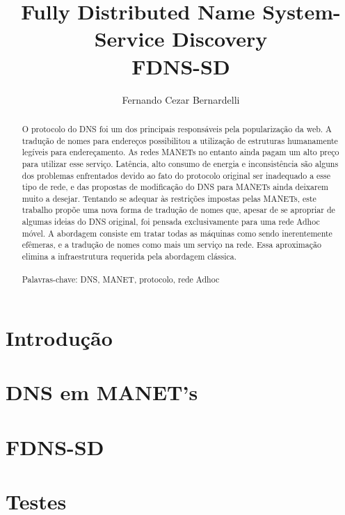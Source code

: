 \documentclass[12pt,a4paper]{style/ufpr}
\title{Fully Distributed Name System-Service Discovery\\FDNS-SD}
\author{Fernando Cezar Bernardelli}
\date{}
\begin{document}
\makecapaproposta
\makecapaproposta

\begin{abstract}
    O protocolo do DNS foi um dos principais responsáveis pela popularização da
    web. A tradução de nomes para endereços possibilitou a utilização de estruturas
    humanamente legíveis para endereçamento. As redes MANETs no entanto ainda pagam
    um alto preço para utilizar esse serviço. Latência, alto consumo de energia e
    inconsistência são alguns dos problemas enfrentados devido ao fato do
    protocolo original ser inadequado a esse tipo de rede, e das propostas de modificação
    do DNS para MANETs ainda deixarem muito a desejar. Tentando se adequar às
    restrições impostas pelas MANETs, este trabalho propõe uma nova forma de
    tradução de nomes que, apesar de se apropriar de algumas ideias do DNS
    original, foi pensada exclusivamente para uma rede Adhoc móvel. A abordagem
    consiste em tratar todas as máquinas como sendo inerentemente efêmeras, e a
    tradução de nomes como mais um serviço na rede. Essa aproximação elimina a
    infraestrutura requerida pela abordagem clássica.
    \\
    \\
    Palavras-chave: DNS, MANET, protocolo, rede Adhoc
\end{abstract}

\tableofcontents
\listoffigures
\newpage

\chapter{Introdução}


\chapter{DNS em MANET's}


\chapter{FDNS-SD}


\chapter{Testes}


\newpage


\end{document}
